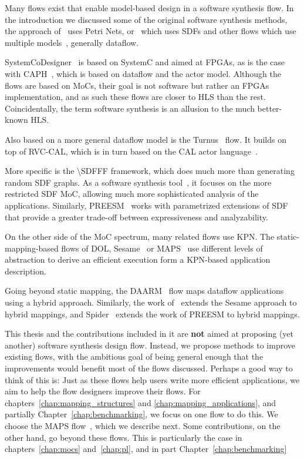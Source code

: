 Many flows exist that enable model-based design in a software synthesis flow.
In the introduction we discussed some of the original software synthesis methods,
the approach of~\cite{lin1998softwaresynthesis} uses Petri Nets, or~\cite{ritz1992softwaresynthesis} which uses \acp{SDF}
and other flows which use multiple models~\cite{bhartacharyya2000softwaresynthesis,pino1995softwaresynthesis,bhattacharyya2012softwaresynthesis}, generally dataflow.

SystemCoDesigner~\cite{haubelt2008systemcodesigner} is based on SystemC and aimed at \acsp{FPGA}, as is the case with CAPH~\cite{serot2013caph}, which is based on dataflow and the actor model.
Although the flows are based on \acp{MoC}, their goal is not software but rather an \acsp{FPGA} implementation, and as such these flows are closer to \ac{HLS} than the rest. 
Coincidentally, the term software synthesis is an allusion to the much better-known \ac{HLS}.

Also based on a more general dataflow model is the Turnus~\cite{casale2013turnus} flow.
It builds on top of RVC-CAL, which is in turn based on the CAL actor language~\cite{eker2003cal}.

More specific is the \ac{\SDFFF}\cite{sdf3} framework, which does much more than generating random \ac{SDF} graphs.
As a software synthesis tool~\cite{stuijk2010predictable}, it focuses on the more restricted \ac{SDF} \ac{MoC}, allowing much more sophisticated analysis of the applications.
Similarly, PREESM~\cite{pelcat2014preesm} works with parametrized extensions of \ac{SDF}~\cite{desnos2013pimm} that provide a greater trade-off between expressiveness and analyzability.

On the other side of the \ac{MoC} spectrum, many related flows use \ac{KPN}.
The static-mapping-based flows of \ac{DOL}\cite{thiele2007DOL}, Sesame~\cite{pimentel2006systematic} or \ac{MAPS}~\cite{maps} use different levels of abstraction to derive an efficient execution form a \ac{KPN}-based application description.

Going beyond static mapping, the DAARM~\cite{weichslgartner2014daarm} flow maps dataflow applications using a hybrid approach.
Similarly, the work of~\cite{quan2015hybrid} extends the Sesame approach to hybrid mappings, and Spider~\cite{heulot2014spider} extends the work of PREESM to hybrid mappings.

This thesis and the contributions included in it are \textbf{not} aimed at proposing (yet another) software synthesis design flow.
Instead, we propose methods to improve existing flows, with the ambitious goal of being general enough that the improvements would benefit most of the flows discussed. 
Perhaps a good way to think of this is: Just as these flows help users write more efficient applications, we aim to help the flow designers improve their flows.
For chapters~\ref{chap:mapping_structures} and \ref{chap:mapping_applications}, and partially Chapter~\ref{chap:benchmarking}, we focus on one flow to do this.
We choose the \ac{MAPS} flow~\cite{maps}, which we describe next.
Some contributions, on the other hand, go beyond these flows. This is particularly the case in chapters~\ref{chap:mocs} and~\ref{chap:pl}, and in part Chapter~\ref{chap:benchmarking} 

